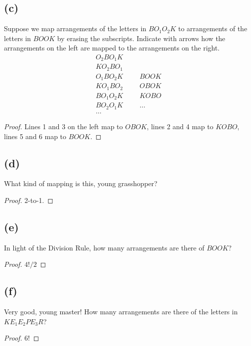 \documentclass[14pt]{extarticle}
\begin{document}
\subsection{(c)}
Suppose we map arrangements of the letters in $BO_1 O_2 K$ to arrangements of the letters in $BOOK$ by erasing the subscripts. Indicate with arrows how the arrangements on the left are mapped to the arrangements on the right.
$$
\begin{array}{cccc}
O_2 B O_1 K & & &\\
KO_2 BO_1   & & &\\
O_1 BO_2 K  & & &BOOK\\
KO_1 BO_2   & & &OBOK\\
BO_1 O_2 K  & & &KOBO\\
BO_2 O_1 K  & & &\ldots\\
\ldots      & & &
\end{array}
$$

\begin{proof}
Lines 1 and 3 on the left map to $OBOK$, lines 2 and 4 map to $KOBO$, lines 5 and 6 map to $BOOK$.
\end{proof}

\subsection{(d)}
What kind of mapping is this, young grasshopper?
\begin{proof}
2-to-1.
\end{proof}

\subsection{(e)}
In light of the Division Rule, how many arrangements are there of $BOOK$?
\begin{proof}
$4! / 2$
\end{proof}

\subsection{(f)}
Very good, young master! How many arrangements are there of the letters in\\ $KE_1 E_2 PE_3 R$?
\begin{proof}
$6!$
\end{proof}
\end{document}
